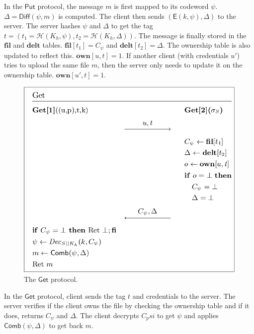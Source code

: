 \noindent
In the $\mathsf{Put}$ protocol, the message $m$ is first mapped to its codeword $\psi$. $\Delta = \mathsf{Diff}(\psi, m)$ is computed. The client then sends $(\mathsf{E}(k,\psi), \Delta)$ to the server. The server hashes $\psi$ and $\Delta$ to get the tag $t = (t_1 = \mathcal{H}(K_h, \psi), t_2 = \mathcal{H}(K_h, \Delta))$. The message is finally stored in the $\textbf{fil}$ and $\textbf{delt}$ tables. $\textbf{fil}[t_1] = C_\psi$ and $\textbf{delt}[t_2] = \Delta$. The ownership table is also updated to reflect this. $\textbf{own}[u,t]=1$. If another client (with credentials $u'$) tries to upload the same file $m$, then the server only needs to update it on the ownership table. $\textbf{own}[u',t]=1$.

\begin{figure}[H]
	\centering
	\includegraphics[scale=0.5]{get}
	\caption{The $\mathsf{Get}$ protocol.}
	\label{fig:get}
\end{figure}

\noindent
In the $\mathsf{Get}$ protocol, client sends the tag $t$ and credentials to the server. The server verifies if the client owns the file  by checking the ownership table and if it does, returns $C_\psi$ and $\Delta$. The client decrypts $C_psi$ to get $\psi$ and applies $\mathsf{Comb}(\psi, \Delta)$ to get back $m$.
